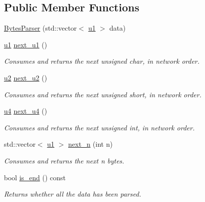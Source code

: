 \subsection*{Public Member Functions}
\begin{DoxyCompactItemize}
\item 
\hyperlink{classBytesParser_ac0b263b48e9a2be675442237cdc11f6c}{Bytes\+Parser} (std\+::vector$<$ \hyperlink{types_8h_a162f47a77ee24f6f77cd8c82ccd40ab7}{u1} $>$ data)
\item 
\hyperlink{types_8h_a162f47a77ee24f6f77cd8c82ccd40ab7}{u1} \hyperlink{classBytesParser_a18a5ff71458418a33c99d301ecc37579}{next\+\_\+u1} ()
\begin{DoxyCompactList}\small\item\em Consumes and returns the next unsigned char, in network order. \end{DoxyCompactList}\item 
\hyperlink{types_8h_ae676e9207f57fb921dca7366b2f59c53}{u2} \hyperlink{classBytesParser_a8c1d8a37eabff268351e38706a78ce2a}{next\+\_\+u2} ()
\begin{DoxyCompactList}\small\item\em Consumes and returns the next unsigned short, in network order. \end{DoxyCompactList}\item 
\hyperlink{types_8h_af3b2d4b29fd9faedc984db3e062b3d5d}{u4} \hyperlink{classBytesParser_a1023beb9a406a24c4080c95fbe8fd884}{next\+\_\+u4} ()
\begin{DoxyCompactList}\small\item\em Consumes and returns the next unsigned int, in network order. \end{DoxyCompactList}\item 
std\+::vector$<$ \hyperlink{types_8h_a162f47a77ee24f6f77cd8c82ccd40ab7}{u1} $>$ \hyperlink{classBytesParser_acb95ccefd93aa90ae9c74aaec13b497e}{next\+\_\+n} (int n)
\begin{DoxyCompactList}\small\item\em Consumes and returns the next {\ttfamily n} bytes. \end{DoxyCompactList}\item 
bool \hyperlink{classBytesParser_a0cef47c62af80c1a50fc507c5a869757}{is\+\_\+end} () const
\begin{DoxyCompactList}\small\item\em Returns whether all the data has been parsed. \end{DoxyCompactList}\item 

\end{DoxyCompactItemize}
